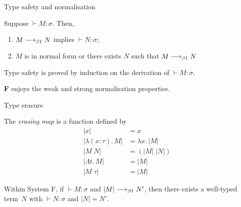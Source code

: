 %
%
%  

\begin{frame}{Type safety and normalisation}
  \begin{theorem}
    Suppose $\vdash M : \sigma$. Then, 
    \begin{enumerate}
      \item $M \longrightarrow_{\beta1} N$ implies $\vdash N : \sigma$; 
      \item $M$ is in normal form or there exists $N$ such that $M \longrightarrow_{\beta1} N$
    \end{enumerate}
  \end{theorem}
  Type safety is proved by induction on the derivation of $\vdash M : \sigma$.

  \begin{theorem}
    \textbf{F} enjoys the weak and strong normalisation properties.
  \end{theorem}
\end{frame}

\begin{frame}{Type erasure}
\begin{definition}
  The \emph{erasing map} is a function defined by
  \begin{align*}
    |x| & = x \\
    |\lambda (x : \tau).\,M| & = \lambda x.\, |M| \\
    |M\;N| & = (|M|\;|N|) \\
    |\Lambda t.\, M| & = |M| \\
    |M\;\tau| & = |M|
  \end{align*}
\end{definition}

\begin{proposition}
  Within System F, if ${}\vdash M : \sigma$ and $|M|
  \longrightarrow_{\beta1} N'$, then there exists a well-typed term~$N$ with
  ${}\vdash N : \sigma$ and $|N| = N'$.
\end{proposition}
\end{frame}

